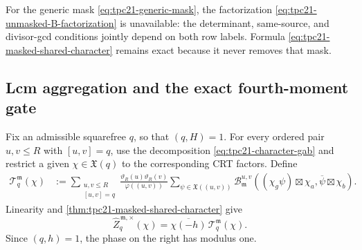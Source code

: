 For the generic mask \eqref{eq:tpc21-generic-mask}, the factorization
\eqref{eq:tpc21-unmasked-B-factorization} is unavailable: the
determinant, same-source, and divisor-gcd conditions jointly depend on
both row labels.  Formula \eqref{eq:tpc21-masked-shared-character}
remains exact because it never removes that mask.

\subsection{Lcm aggregation and the exact fourth-moment gate}

Fix an admissible squarefree \(q\), so that \((q,H)=1\).  For every
ordered pair \(u,v\leq R\) with
\([u,v]=q\), use the decomposition \eqref{eq:tpc21-character-gab} and
restrict a given \(\chi\in\mathfrak X(q)\) to the corresponding CRT
factors.  Define
\begin{align}
 \mathcal T_q^{\mathfrak m}(\chi)
 &:=\sum_{\substack{u,v\leq R\\{}[u,v]=q}}
 \frac{\vartheta_R(u)\vartheta_R(v)}{\varphi((u,v))}
 \sum_{\psi\in\mathfrak X((u,v))}
 \mathcal B_{\mathfrak m}^{u,v}
 \left(
  (\chi_g\psi)\boxtimes\chi_a,
  \overline\psi\boxtimes\chi_b
 \right).
 \label{eq:tpc21-aggregated-character-coefficient}
\end{align}
Linearity and \cref{thm:tpc21-masked-shared-character} give
\begin{equation}
 \boxed{
 \widehat Z_q^{\,\mathfrak m,\times}(\chi)
 =\overline{\chi(-h)}\,
  \mathcal T_q^{\mathfrak m}(\chi).}
 \label{eq:tpc21-aggregated-character-transform}
\end{equation}
Since \((q,h)=1\), the phase on the right has modulus one.


